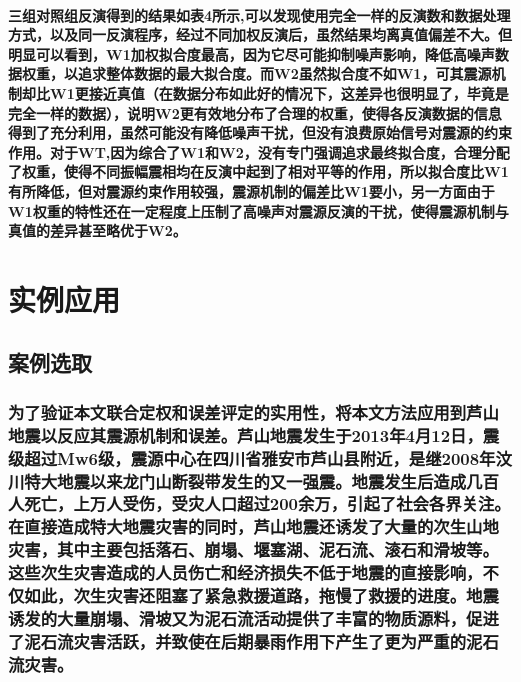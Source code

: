 \documentclass[a4paper,12pt,single,pdftex]{scrartcl}
\begin{document}
\label{ID_1845269170}\paragraph{三组对照组反演得到的结果如表4所示,可以发现使用完全一样的反演数和数据处理方式，以及同一反演程序，经过不同加权反演后，虽然结果均离真值偏差不大。但明显可以看到，W1加权拟合度最高，因为它尽可能抑制噪声影响，降低高噪声数据权重，以追求整体数据的最大拟合度。而W2虽然拟合度不如W1，可其震源机制却比W1更接近真值（在数据分布如此好的情况下，这差异也很明显了，毕竟是完全一样的数据），说明W2更有效地分布了合理的权重，使得各反演数据的信息得到了充分利用，虽然可能没有降低噪声干扰，但没有浪费原始信号对震源的约束作用。对于WT,因为综合了W1和W2，没有专门强调追求最终拟合度，合理分配了权重，使得不同振幅震相均在反演中起到了相对平等的作用，所以拟合度比W1有所降低，但对震源约束作用较强，震源机制的偏差比W1要小，另一方面由于W1权重的特性还在一定程度上压制了高噪声对震源反演的干扰，使得震源机制与真值的差异甚至略优于W2。}

\label{ID_1368135373}\paragraph{}

\label{ID_89289087}\section{实例应用}

\label{ID_1189436416}\subsection{案例选取}

\label{ID_887518159}\subsubsection{为了验证本文联合定权和误差评定的实用性，将本文方法应用到芦山地震以反应其震源机制和误差。芦山地震发生于2013年4月12日，震级超过Mw6级，震源中心在四川省雅安市芦山县附近，是继2008年汶川特大地震以来龙门山断裂带发生的又一强震。地震发生后造成几百人死亡，上万人受伤，受灾人口超过200余万\citep{崔鹏2013}，引起了社会各界关注。在直接造成特大地震灾害的同时，芦山地震还诱发了大量的次生山地灾害，其中主要包括落石、崩塌、堰塞湖、泥石流、滚石和滑坡等\citep{陈晓清2013}。这些次生灾害造成的人员伤亡和经济损失不低于地震的直接影响，不仅如此，次生灾害还阻塞了紧急救援道路，拖慢了救援的进度。地震诱发的大量崩塌、滑坡又为泥石流活动提供了丰富的物质源料，促进了泥石流灾害活跃，并致使在后期暴雨作用下产生了更为严重的泥石流灾害。}
\end{document}
